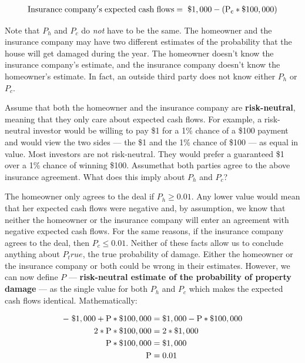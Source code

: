 \documentclass[article]{jss}
\begin{document}
\begin{equation}
 \begin{aligned}
   {\rm Insurance\hspace{3pt}company's\hspace{3pt}expected\hspace{3pt}cash\hspace{3pt}flows = \hspace{3pt}\$1,000 - (P_c * {\$100,000})}
    \end{aligned}
    \label{eqn:companyECF}
\end{equation}

Note that $P_h$ and $P_c$ do \emph{not} have to be the same. The homeowner and the insurance company may have two different estimates of the probability that the house will get damaged during the year. The homeowner doesn't know the insurance company's estimate, and the insurance company doesn't know the homeowner's estimate. In fact, an outside third party does not know either $P_h$ or $P_c$. 

Assume that both the homeowner and the insurance company are \textbf{risk-neutral}, meaning that they only care about expected cash flows. For example, a risk-neutral investor would be willing to pay \$1 for a 1\% chance of a \$100 payment and would view the two sides --- the \$1 and the 1\% chance of \$100 --- as equal in value. Most investors are not risk-neutral. They would prefer a guaranteed \$1 over a 1\% chance of winning \$100. Assumethat both parties agree to the above insurance agreement. What does this imply about $P_h$ and $P_c$? 

The homeowner only agrees to the deal if $P_h \geq 0.01$. Any lower value would mean that her expected cash flows were negative and, by assumption, we know that neither the homeowner or the insurance company will enter an agreement with negative expected cash flows. For the same reasons, if the insurance company agrees to the deal, then $P_c \leq 0.01$. Neither of these facts allow us to conclude anything about $P_true$, the true probability of damage. Either the homeowner or the insurance company or both could be wrong in their estimates. However, we can now define $P$ --- \textbf{risk-neutral estimate of the probability of property damage} --- as the single value for both $P_h$ and $P_c$ which makes the expected cash flows identical. Mathematically:

\label{eqn:PropertyInsurance}
\begin{align}
  \rm -\hspace{3pt}\$1,000 + P * {\$100,000}  &= \rm \$1,000 - P * {\$100,000} \\
  \rm 2 * P * {\$100,000}  &=  \rm 2 * \$1,000 \\
  \rm P * {\$100,000}  &= \rm {\$1,000} \\
  \rm P  &= \rm 0.01
\end{align}
\end{document}
